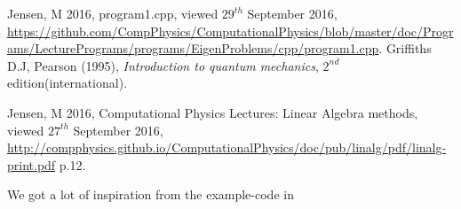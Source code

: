 \documentclass[11pt,a4paper,notitlepage]{article}
\begin{document}
\begin{thebibliography}{9}
  Jensen, M 2016,
  program1.cpp,
  viewed $29^{th}$ September 2016,
  \url{https://github.com/CompPhysics/ComputationalPhysics/blob/master/doc/Programs/LecturePrograms/programs/EigenProblems/cpp/program1.cpp}.
  Griffiths D.J, 
  Pearson (1995),
  \emph{Introduction to quantum mechanics},
  $2^{nd}$ edition(international).
  
	Jensen, M 2016, 
	Computational Physics Lectures: Linear
Algebra methods, 
	viewed $27^{th}$ September 2016, 
	\url{http://compphysics.github.io/ComputationalPhysics/doc/pub/linalg/pdf/linalg-print.pdf} p.12. 
\end{thebibliography}

We got a lot of inspiration from the example-code in \cite[web-site]{example_code}
\end{document}
